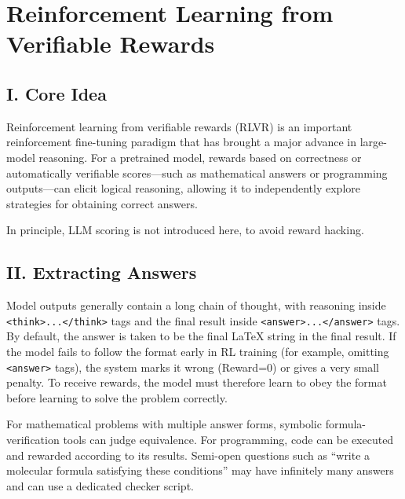 \setcounter{section}{3}

\hypertarget{reinforcement-learning-from-verifiable-rewards}{%
\section{Reinforcement Learning from Verifiable Rewards}\label{reinforcement-learning-from-verifiable-rewards}}

\hypertarget{i.-core-idea-6}{%
\subsection{I. Core Idea}\label{i.-core-idea-6}}

Reinforcement learning from verifiable rewards (RLVR) is an important reinforcement fine-tuning paradigm that has brought a major advance in large-model reasoning. For a pretrained model, rewards based on correctness or automatically verifiable scores---such as mathematical answers or programming outputs---can elicit logical reasoning, allowing it to independently explore strategies for obtaining correct answers.

In principle, LLM scoring is not introduced here, to avoid reward hacking.

\hypertarget{ii.-extracting-answers}{%
\subsection{II. Extracting Answers}\label{ii.-extracting-answers}}

Model outputs generally contain a long chain of thought, with reasoning inside \texttt{\textless{}think\textgreater{}...\textless{}/think\textgreater{}} tags and the final result inside \texttt{\textless{}answer\textgreater{}...\textless{}/answer\textgreater{}} tags. By default, the answer is taken to be the final LaTeX string in the final result. If the model fails to follow the format early in RL training (for example, omitting \texttt{\textless{}answer\textgreater{}} tags), the system marks it wrong (Reward=0) or gives a very small penalty. To receive rewards, the model must therefore learn to obey the format before learning to solve the problem correctly.

For mathematical problems with multiple answer forms, symbolic formula-verification tools can judge equivalence. For programming, code can be executed and rewarded according to its results. Semi-open questions such as ``write a molecular formula satisfying these conditions'' may have infinitely many answers and can use a dedicated checker script.

